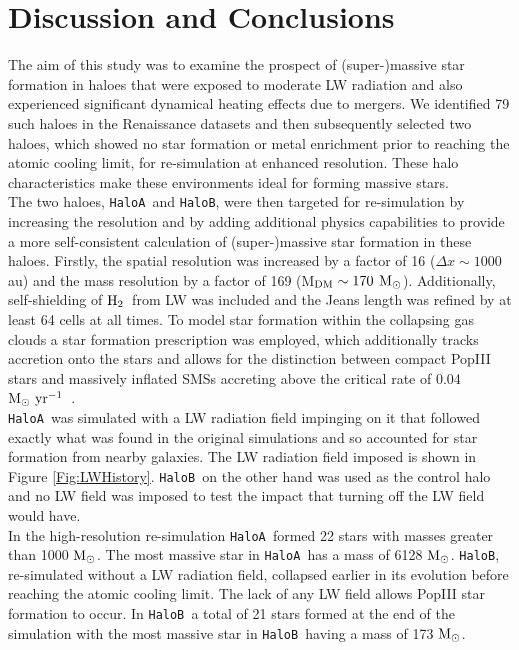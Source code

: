 \documentclass[graphics, twocolumn, usenatbib]{mn2e}
\newcommand{\msolarc} {$\rm{M_{\odot}}$}
\newcommand{\msolaryrc} {$\rm{M_{\odot}~yr^{-1}}$}
\newcommand{\molH} {$\rm{H_2}$~}
\newcommand{\ha} {\texttt{HaloA~}}
\newcommand{\hb} {\texttt{HaloB~}}
\newcommand{\hbc} {\texttt{HaloB}}
\begin{document}
\section{Discussion and Conclusions} \label{Sec:Discussion}
The aim of this study was to examine the prospect of (super-)massive star formation in haloes
that were exposed to moderate LW radiation and also experienced significant dynamical heating
effects due to mergers. We identified 79 such haloes in the Renaissance 
datasets \citep{Regan_2020} and then subsequently selected two haloes, which showed no star formation or metal enrichment prior to reaching the
atomic cooling limit, for re-simulation at enhanced resolution. These halo characteristics make these environments ideal for forming massive
stars. \\
\indent The two haloes, \ha and \hbc, were then targeted for re-simulation by 
increasing the resolution and by adding additional physics capabilities to provide a more self-consistent calculation of (super-)massive star formation in these haloes. Firstly, the spatial resolution was increased by a factor of 16 ($\Delta x \sim 1000$ au) and the mass resolution by a factor of
169 (M$_{\rm DM} \sim 170$ \msolarc). Additionally, self-shielding of \molH from LW was included and the Jeans length was refined by at least 64 cells at all times.  To model star formation within the collapsing gas clouds a star formation prescription was employed, which additionally tracks accretion
onto the stars and allows for the distinction between compact PopIII stars and massively inflated
SMSs accreting above the critical rate of 0.04 \msolaryrc \ \citep{Sakurai_2016}.\\
\indent \ha was simulated with a LW radiation field impinging on it that followed exactly what was
found in the original simulations and so accounted for star formation from nearby galaxies. The
LW radiation field imposed is shown in Figure \ref{Fig:LWHistory}. \hb on the other hand was used as the
control halo and no LW field was imposed to test the impact that turning off the LW field would have.\\
\indent In the high-resolution re-simulation \ha formed 22 stars with masses greater than 1000
\msolarc. The most massive star in \ha has a mass of 6128 \msolarc. \hbc, re-simulated without
a LW radiation field, collapsed earlier in its evolution before reaching the atomic cooling limit.
The lack of any LW field allows PopIII star formation to occur. In \hb a total of 21 stars
formed at the end of the simulation with the most massive star in \hb having a mass of 173 \msolarc.
\end{document}
